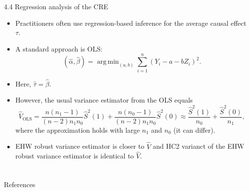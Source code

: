 \documentclass[aspectratio=169, 12pt]{beamer}
\DeclareMathOperator*{\argmin}{arg\,min}
\begin{document}
\begin{frame}{4.4 Regression analysis of the CRE}
  \begin{itemize}
    \item Practitioners often use regression-based inference for the average causal effect $\tau$.
    \item A standard approach is OLS: $$(\widehat{\alpha}, \widehat{\beta}) = \argmin_{(a,b)}\sum_{i=1}^{n}(Y_i-a-bZ_i)^2.$$
    \item Here, $\widehat{\tau} = \widehat{\beta}$.
    \item However, the usual variance estimator from the OLS equals
    \[
    \widehat{V}_\text{OLS} = \frac{n(n_1-1)}{(n-2)n_1n_0}\widehat{S}^2(1) + \frac{n(n_0-1)}{(n-2)n_1n_0}\widehat{S}^2(0) \approx \frac{\widehat{S}^2(1)}{n_0} + \frac{\widehat{S}^2(0)}{n_1},
    \]
    where the approximation holds with large $n_1$ and $n_0$ (it can differ).
    \item EHW robust variance estimator is closer to $\widehat{V}$ and HC2 varianct of the EHW robust variance estimator is identical to $\widehat{V}$.
  \end{itemize}
\end{frame}




\section{}
\begin{frame}{References}
  \beamerdefaultoverlayspecification{}
  \small
  
\end{frame}
\end{document}
